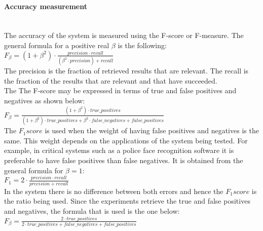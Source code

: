 
		\paragraph{Accuracy measurement}\mbox{}\\


		The accuracy of the system is measured using the F-score or F-measure. 
		The general formula for a positive real $\beta$ is the following: 
		\\

		$F_\beta=(1+\beta^2)\cdot\frac{precision \cdot recall}{(\beta^2 \cdot precision )+recall}$
		\\

		The precision is the fraction of retrieved results that are relevant.  
		The recall is the fraction of the results that are relevant and that have succeeded. 
		\\
		The 
		The F-score may be expressed in terms of true and false positives and negatives as shown below: 
		\\

		$F_\beta=\frac{(1+\beta^2)\cdot true\_positives}{(1+\beta^2)\cdot true\_positives +\beta^2 \cdot false\_negatives +false\_positives}$
		\\

		The $F_1 score$ is used when the weight of having false positives and negatives is the same. 
		This weight depends on the applications of the system being tested. 
		For example, in critical systems such as a police face recognition software it is preferable to have false positives than false negatives. 
		It is obtained from the general formula for $\beta=1$: 	
		\\

		$F_1=2\cdot\frac{precision \cdot recall}{precision + recall}$
		\\

		In the system there is no difference between both errors and hence the $F_1 score$ is the ratio being used. 
		Since the experiments retrieve the true and false positives and negatives, the formula that is used is the one below: 
		\\


		$F_\beta=\frac{2\cdot true\_positives}{2\cdot true\_positives + false\_negatives +false\_positives}$
		\\

